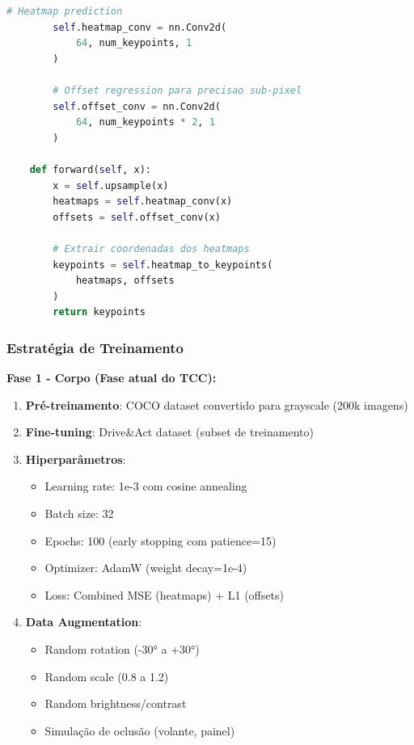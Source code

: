 \documentclass[12pt, a4paper]{article}
\begin{document}
\begin{lstlisting}[language=Python, caption=Módulo 2 - Detecção 2D]
        # Heatmap prediction
        self.heatmap_conv = nn.Conv2d(
            64, num_keypoints, 1
        )
        
        # Offset regression para precisao sub-pixel
        self.offset_conv = nn.Conv2d(
            64, num_keypoints * 2, 1
        )
    
    def forward(self, x):
        x = self.upsample(x)
        heatmaps = self.heatmap_conv(x)
        offsets = self.offset_conv(x)
        
        # Extrair coordenadas dos heatmaps
        keypoints = self.heatmap_to_keypoints(
            heatmaps, offsets
        )
        return keypoints
\end{lstlisting}

\subsubsection{Estratégia de Treinamento}

\textbf{Fase 1 - Corpo (Fase atual do TCC):}
\begin{enumerate}
    \item \textbf{Pré-treinamento}: COCO dataset convertido para grayscale (200k imagens)
    \item \textbf{Fine-tuning}: Drive\&Act dataset (subset de treinamento)
    \item \textbf{Hiperparâmetros}:
    \begin{itemize}
        \item Learning rate: 1e-3 com cosine annealing
        \item Batch size: 32
        \item Epochs: 100 (early stopping com patience=15)
        \item Optimizer: AdamW (weight decay=1e-4)
        \item Loss: Combined MSE (heatmaps) + L1 (offsets)
    \end{itemize}
    \item \textbf{Data Augmentation}:
    \begin{itemize}
        \item Random rotation (-30° a +30°)
        \item Random scale (0.8 a 1.2)
        \item Random brightness/contrast
        \item Simulação de oclusão (volante, painel)
    \end{itemize}
\end{enumerate}
\end{document}
